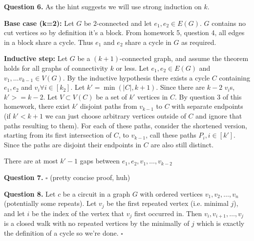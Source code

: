 \documentclass[letterpaper, reqno,11pt]{article}
\begin{document}
{\medskip\noindent\bf Question 6.} As the hint suggests we will use strong induction on $k$. 

{\noindent\bf Base case (k=2):} Let $G$ be $2$-connected and let $e_1,e_2\in E(G)$. $G$ contains no cut vertices so by definition it's a block. From homework 5, question 4, all edges in a block share a cycle. Thus $e_1$ and $e_2$ share a cycle in $G$ as required. 

{\noindent\bf Inductive step:} Let $G$ be a $(k+1)$-connected graph, and assume the theorem holds for all graphs of connectivity $k$ or less. Let $e_1,e_2\in E(G)$ and $v_1,\ldots v_{k-1}\in V(G)$. By the inductive hypothesis there exists a cycle $C$ containing $e_1,e_2$ and $v_i\forall i\in [k_2]$. Let $k'=\min(|C|, k+1)$. Since there are $k-2$ $v_i$s, $k'>=k-2$. Let $V\subset V(C)$ be a set of $k'$ vertices in $C$. By question 3 of this homework, there exist $k'$ disjoint paths from $v_{k-1}$ to $C$ with separate endpoints (if $k'<k+1$ we can just choose arbitrary vertices outside of $C$ and ignore that paths resulting to them). For each of these paths, consider the shortened version, starting from its first intersection of $C$, to $v_{k-1}$, call these paths $P_i,i\in [k']$. Since the paths are disjoint their endpoints in $C$ are also still distinct. 

There are at most $k'-1$ gaps between $e_1,e_2,v_1,\ldots, v_{k-2}$


{\medskip\noindent\bf Question 7.} $\square$ (pretty concise proof, huh)


{\medskip\noindent\bf Question 8.} Let $c$ be a circuit in a graph $G$ with ordered vertices $v_1,v_2,\ldots,v_n$ (potentially some repeats). Let $v_j$ be the first repeated vertex (i.e. minimal $j$), and let $i$ be the index of the vertex that $v_j$ first occurred in. Then $v_i, v_{i+1}, \ldots, v_j$ is a closed walk with no repeated vertices by the minimally of $j$ which is exactly the definition of a cycle so we're done. $\square$
\end{document}
